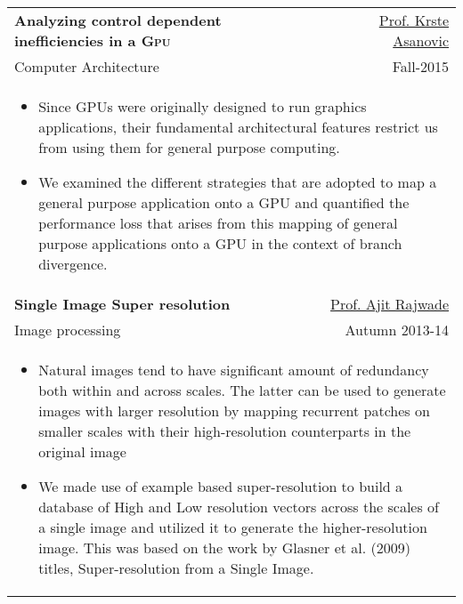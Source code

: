 \begin{tabularx}{.95\textwidth}{lr}
\textbf{Analyzing control dependent inefficiencies in a \textsc{Gpu}} &
\href{https://www.eecs.berkeley.edu/~krste/}{Prof. Krste Asanovic}\\
Computer Architecture & Fall-2015 \\
\multicolumn{2}{p{16cm}}{
\begin{itemize}
  	\item Since GPUs were originally designed to run graphics applications, their fundamental architectural features restrict us from using them for general purpose computing. 
	\item  We examined the different strategies that are adopted to map a general purpose application onto a GPU and quantified the performance loss that arises from this mapping of general purpose applications onto a GPU in the context of branch divergence.
\end{itemize}
}\\

\textbf{Single Image Super resolution} & \href{https://www.cse.iitb.ac.in/~ajitvr/}{Prof. Ajit Rajwade}\\
Image processing & Autumn 2013-14\\
\multicolumn{2}{p{16cm}}{
\begin{itemize}
	\item Natural images tend to have significant amount of redundancy both within and across scales. The latter can be used to generate images with larger resolution by mapping recurrent patches on smaller scales with their high-resolution counterparts in the original image
	\item We made use of example based super-resolution to build a database of High and Low resolution vectors across the scales of a single image and utilized it to generate the higher-resolution image. This was based on the work by Glasner et al. (2009) titles, Super-resolution from a Single Image.
\end{itemize}
}\\


\end{tabularx}
